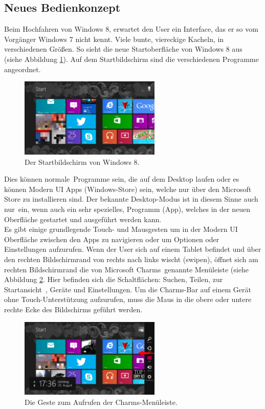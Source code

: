 \documentclass[12pt,a4paper,bibtotoc]{scrartcl}
\begin{document}
\subsection{Neues Bedienkonzept}
\label{subsec:bedienkonzept}
Beim Hochfahren von Windows 8, erwartet den User ein Interface, das er so vom Vorgänger Windows 7 nicht kennt. Viele bunte, viereckige Kacheln, in verschiedenen Größen. So sieht die neue Startoberfläche von Windows 8 aus (siehe Abbildung \ref{fig:win8startscreen}). Auf dem Startbildschirm sind die verschiedenen Programme angeordnet.

\begin{figure}[h]	
	\centering
	\includegraphics[width=0.6\textwidth]{Bilder/Screenshots/windows8/win8_startscreen.png} 
	\caption{Der Startbildschirm von Windows 8.}
	\label{fig:win8startscreen}
\end{figure}

Dies können \glqq normale\grqq\ Programme sein, die auf dem Desktop laufen oder es können Modern UI Apps (Windows-Store) sein, welche nur über den Microsoft Store zu installieren sind. Der bekannte Desktop-Modus ist in diesem Sinne auch \glqq nur\grqq\ ein, wenn auch ein sehr spezielles, Programm (App), welches in der neuen Oberfläche gestartet und ausgeführt werden kann.\\
Es gibt einige grundlegende Touch- und Mausgesten um in der Modern UI Oberfläche zwischen den Apps zu navigieren oder um Optionen oder Einstellungen aufzurufen. Wenn der User sich auf einem Tablet befindet und über den rechten Bildschirmrand von rechts nach links wischt (swipen), öffnet sich am rechten Bildschirmrand die von Microsoft \glqq Charms\grqq\ genannte Menüleiste (siehe Abbildung \ref{fig:charms}. Hier befinden sich die Schaltflächen: Suchen, Teilen, \glqq zur Startansicht\grqq\ , Geräte und Einstellungen. Um die Charms-Bar auf einem Gerät ohne Touch-Unterstützung aufzurufen, muss die Maus in die obere oder untere rechte Ecke des Bildschirms geführt werden. 

\begin{figure}[h]	
	\centering
	\includegraphics[width=0.6\textwidth]{Bilder/Screenshots/windows8/charm_bar.png} 
	\caption{Die Geste zum Aufrufen der Charms-Menüleiste.}
	\label{fig:charms}
\end{figure}  
\end{document}
